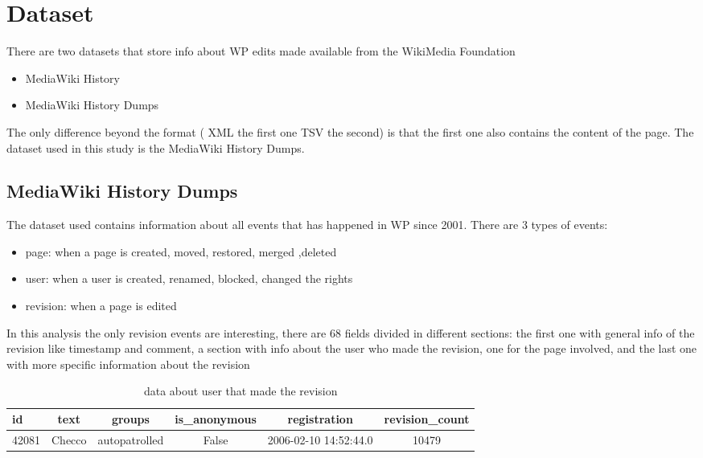 \section{Dataset}
There are two datasets that store info about WP edits made available from the WikiMedia Foundation
\begin{itemize}
    \item MediaWiki History
    \item MediaWiki History Dumps
\end{itemize}

The only difference beyond the format ( XML the first one TSV the second) is that the first one also
contains the content of the page. The dataset used in this study is the MediaWiki History Dumps.

\subsection{MediaWiki History Dumps}
The dataset used contains information about all events that has happened in WP since 2001. There are 3 types
of events:
\begin{itemize}
    \item page: when a page is created, moved, restored, merged ,deleted 
    \item user: when a user is created, renamed, blocked, changed the rights 
    \item revision: when a page is edited 
\end{itemize}

In this analysis the only revision events are interesting, there are 68 fields divided in different
 sections: the first one with general info of the revision like timestamp and comment, a section
 with info about the user who made the revision, one for the page involved, and the last one with
 more specific information about the revision



\begin{table}[H]
    \centering
    \begin{tabularx}{\columnwidth}{@{}Xccccc@{}}
        \midrule
        \textbf{id} & \textbf{text} & \textbf{groups} & \textbf{is\_anonymous} & \textbf{registration} & \textbf{revision\_count}\\ \toprule
        42081 & Checco & autopatrolled & False & 2006-02-10 14:52:44.0 & 10479 \\

         \bottomrule
    \end{tabularx}
    \caption{data about user that made the revision}
\end{table}


